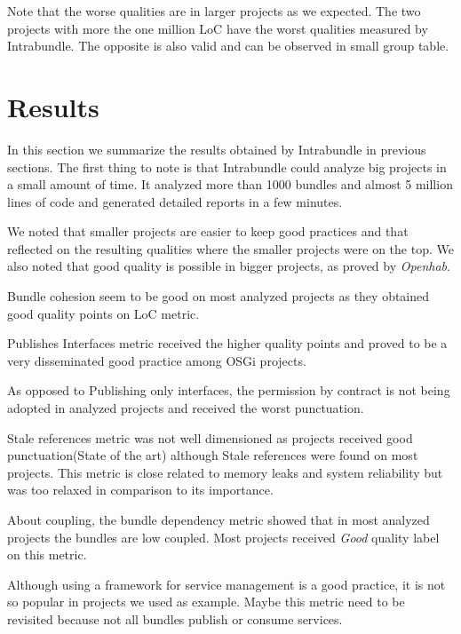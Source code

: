 Note that the worse qualities are in larger projects as we expected. The two projects with more the one million LoC have the worst qualities measured by Intrabundle. The opposite is also valid and can be observed in small group table. 

\section{Results}
In this section we summarize the results obtained by Intrabundle in previous sections. 
The first thing to note is that Intrabundle could analyze big projects in a small amount of time. It analyzed more than 1000 bundles and almost 5 million lines of code and generated detailed reports in a few minutes.

We noted that smaller projects are easier to keep good practices and that reflected on the resulting qualities where the smaller projects were on the top. We also noted that good quality is possible in bigger projects, as proved by \emph{Openhab}.

Bundle cohesion seem to be good on most analyzed projects as they obtained good quality points on LoC metric.

Publishes Interfaces metric received the higher quality points and proved to be a very disseminated good practice among OSGi projects.

As opposed to Publishing only interfaces, the permission by contract is not being adopted in analyzed projects and received the worst punctuation.

Stale references metric was not well dimensioned as projects received good punctuation(State of the art) although Stale references were found on most projects. This metric is close related to memory leaks and system reliability but was too relaxed in comparison to its importance. 

About coupling, the bundle dependency metric showed that in most analyzed projects the bundles are low coupled. Most projects received \emph{Good} quality label on this metric.

Although using a framework for service management is a good practice, it is not so popular in projects we used as example. Maybe this metric need to be revisited because not all bundles publish or consume services.

